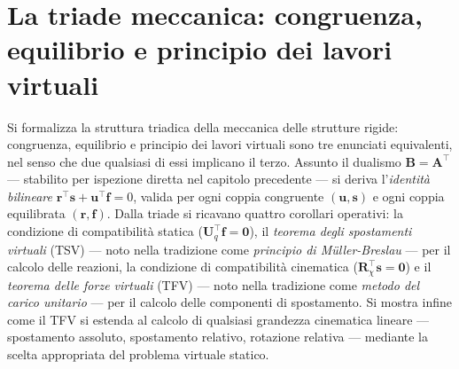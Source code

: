 \graphicspath{{Parti/P03-Meccanica_SR/C11-TLV/Figure/}}
\chapter{La triade meccanica: congruenza, equilibrio e principio dei lavori virtuali  }\label{cap:TLV}


\begin{sommario}
	Si formalizza la struttura triadica della meccanica
	delle strutture rigide: congruenza, equilibrio e
	principio dei lavori virtuali sono tre enunciati
	equivalenti, nel senso che due qualsiasi di essi
	implicano il terzo. Assunto il dualismo
	$\bm{B} = \bm{A}^{\top}$ --- stabilito per ispezione
	diretta nel capitolo precedente --- si deriva
	l'\emph{identità bilineare}
	$\bm{r}^{\top}\bm{s} + \bm{u}^{\top}\bm{f} = 0$,
	valida per ogni coppia congruente $(\bm{u}, \bm{s})$
	e ogni coppia equilibrata $(\bm{r}, \bm{f})$.
	Dalla triade si ricavano quattro corollari operativi:
	la condizione di compatibilità statica
	($\bm{U}_q^{\top}\bm{f} = \bm{0}$), il \emph{teorema
		degli spostamenti virtuali} (TSV) --- noto nella
	tradizione come \emph{principio di Müller-Breslau}
	--- per il calcolo delle reazioni, la condizione di
	compatibilità cinematica
	($\bm{R}_\chi^{\top}\bm{s} = \bm{0}$) e il
	\emph{teorema delle forze virtuali} (TFV) --- noto
	nella tradizione come \emph{metodo del carico unitario}
	--- per il calcolo delle componenti di spostamento.
	Si mostra infine come il TFV si estenda al calcolo di
	qualsiasi grandezza cinematica lineare --- spostamento
	assoluto, spostamento relativo, rotazione relativa ---
	mediante la scelta appropriata del problema virtuale
	statico.
\end{sommario}




